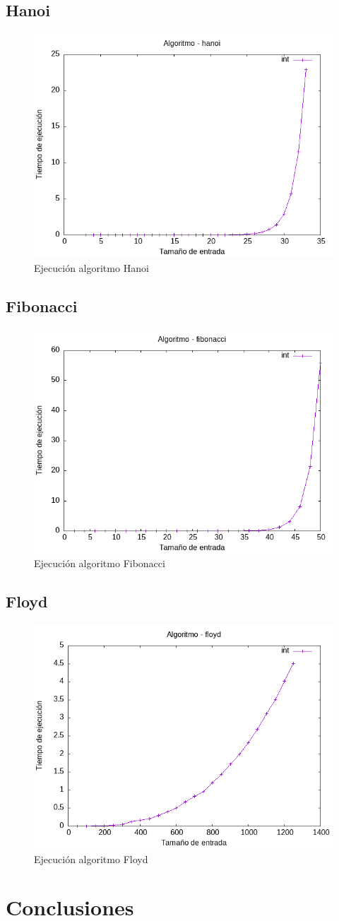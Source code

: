 \documentclass[11pt]{article}
\begin{document}
\subsection{Hanoi}
\begin{figure}[H]
    \centering
        \includegraphics[width=0.5\linewidth]{assets/Img/hanoiint.png}
        \caption{Ejecución algoritmo Hanoi}
        \label{fig:hanoi}
\end{figure}
\subsection{Fibonacci}
\begin{figure}[H]
    \centering
        \includegraphics[width=0.5\linewidth]{assets/Img/fibonacciint.png}
        \caption{Ejecución algoritmo Fibonacci}
        \label{fig:fibonacci}
\end{figure}
\subsection{Floyd}
\begin{figure}[H]
    \centering
        \includegraphics[width=0.5\linewidth]{assets/Img/floydint.png}
        \caption{Ejecución algoritmo Floyd}
        \label{fig:floyd}
\end{figure}
\section{Conclusiones}
\end{document}
